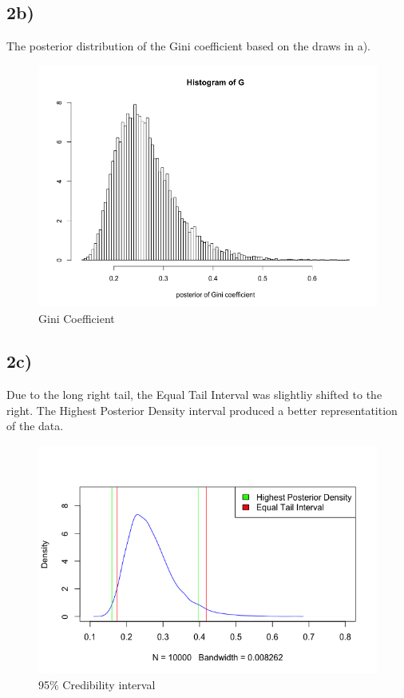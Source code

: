 \documentclass[]{article}
\begin{document}
\newpage

\subsection{2b)}\label{b-1}

The posterior distribution of the Gini coefficient based on the draws in
a).

\begin{figure}
\centering
\includegraphics{assets/lab_1_2_b.png}
\caption{Gini Coefficient}
\end{figure}

\newpage

\subsection{2c)}\label{c-1}

Due to the long right tail, the Equal Tail Interval was slightliy
shifted to the right. The Highest Posterior Density interval produced a
better representatition of the data.

\begin{figure}
\centering
\includegraphics{assets/lab_1_2_c.png}
\caption{95\% Credibility interval}
\end{figure}
\end{document}
